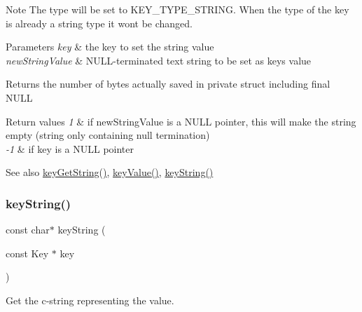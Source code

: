 \begin{DoxyNote}{Note}
The type will be set to K\+E\+Y\+\_\+\+T\+Y\+P\+E\+\_\+\+S\+T\+R\+I\+NG. When the type of the key is already a string type it won\textquotesingle{}t be changed.
\end{DoxyNote}

\begin{DoxyParams}{Parameters}
{\em key} & the key to set the string value \\
\hline
{\em new\+String\+Value} & N\+U\+L\+L-\/terminated text string to be set as {\ttfamily key\textquotesingle{}s} value \\
\hline
\end{DoxyParams}
\begin{DoxyReturn}{Returns}
the number of bytes actually saved in private struct including final N\+U\+LL 
\end{DoxyReturn}

\begin{DoxyRetVals}{Return values}
{\em 1} & if new\+String\+Value is a N\+U\+LL pointer, this will make the string empty (string only containing null termination) \\
\hline
{\em -\/1} & if key is a N\+U\+LL pointer \\
\hline
\end{DoxyRetVals}
\begin{DoxySeeAlso}{See also}
\hyperlink{group__keyvalue_ga41b9fac5ccddafe407fc0ae1e2eb8778}{key\+Get\+String()}, \hyperlink{group__keyvalue_ga6f29609c5da53c6dc26a98678d5752af}{key\+Value()}, \hyperlink{group__keyvalue_ga880936f2481d28e6e2acbe7486a21d05}{key\+String()} 
\end{DoxySeeAlso}
\mbox{\label{group__keyvalue_ga880936f2481d28e6e2acbe7486a21d05}} 
\subsubsection{\texorpdfstring{key\+String()}{keyString()}}
{\footnotesize\ttfamily const char$\ast$ key\+String (\begin{DoxyParamCaption}\item[{const Key $\ast$}]{key }\end{DoxyParamCaption})}



Get the c-\/string representing the value. 

